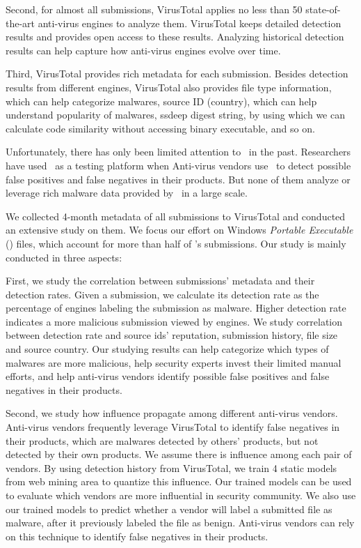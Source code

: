 Second, for almost all submissions, 
VirusTotal applies no less than 50 state-of-the-art anti-virus engines to analyze them. 
VirusTotal keeps detailed detection results and provides open access to these results. 
Analyzing historical detection results can help capture how anti-virus engines evolve over time. 

Third, VirusTotal provides rich metadata for each submission. 
Besides detection results from different engines, 
VirusTotal also provides file type information, which can help categorize malwares, 
source ID (country), which can help understand popularity of malwares, 
ssdeep digest string, by using which we can calculate code similarity without accessing binary executable, and so on. 

Unfortunately, there has only been limited attention to \vt\ in the past. 
Researchers have used \vt\ as a testing platform when 
Anti-virus vendors use \vt\ to detect possible false positives and false negatives in their products. 
But none of them analyze or leverage rich malware data provided by \vt\ in a large scale. 

We collected 4-month metadata of all submissions to VirusTotal 
and conducted an extensive study on them.
We focus our effort on Windows \textit{Portable Executable} ({\em \pe}) files, 
which account for more than half of \vt{}’s submissions.
Our study is mainly conducted in three aspects: 

First, we study the correlation between submissions’ metadata and their detection rates. 
Given a submission, 
we calculate its detection rate as the percentage of engines 
labeling the submission as malware. 
Higher detection rate indicates a more malicious submission viewed by engines.  
We study correlation between detection rate 
and source ids’ reputation, submission history, file size and source country. 
Our studying results can help categorize which types of malwares are more malicious, 
help security experts invest their limited manual efforts, 
and help anti-virus vendors identify possible false positives and false negatives in their products.   


Second, we study how influence propagate among different anti-virus vendors. 
Anti-virus vendors frequently leverage VirusTotal to identify false negatives in their products, 
which are malwares detected by others’ products, 
but not detected by their own products. 
We assume there is influence among each pair of vendors. 
By using detection history from VirusTotal, 
we train 4 static models from web mining area to quantize this influence. 
Our trained models can be used to evaluate which vendors are more influential in security community. 
We also use our trained models to predict whether a vendor will label a submitted file as malware, 
after it previously labeled the file as benign. 
Anti-virus vendors can rely on this technique to identify false negatives in their products. 

